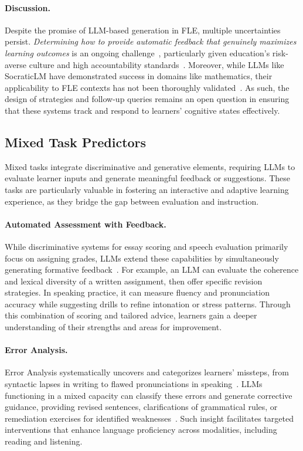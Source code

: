 \paragraph{Discussion.} Despite the promise of LLM-based generation in FLE, multiple uncertainties persist. \textit{Determining how to provide automatic feedback that genuinely maximizes learning outcomes} is an ongoing challenge~\cite{stamper2024enhancing}, particularly given education’s risk-averse culture and high accountability standards~\cite{xiao2024humanaicollaborativeessayscoring}. Moreover, while LLMs like SocraticLM have demonstrated success in domains like mathematics, their applicability to FLE contexts has not been thoroughly validated~\cite{liusocraticlm}. As such, the design of strategies and follow-up queries remains an open question in ensuring that these systems track and respond to learners' cognitive states effectively.


\subsection{Mixed Task Predictors}
Mixed tasks integrate discriminative and generative elements, requiring LLMs to evaluate learner inputs and generate meaningful feedback or suggestions. These tasks are particularly valuable in fostering an interactive and adaptive learning experience, as they bridge the gap between evaluation and instruction.

\paragraph{Automated Assessment with Feedback.} While discriminative systems for essay scoring and speech evaluation primarily focus on assigning grades, LLMs extend these capabilities by simultaneously generating formative feedback~\cite{katuka2024investigating,stahl2024exploring}. For example, an LLM can evaluate the coherence and lexical diversity of a written assignment, then offer specific revision strategies. In speaking practice, it can measure fluency and pronunciation accuracy while suggesting drills to refine intonation or stress patterns. Through this combination of scoring and tailored advice, learners gain a deeper understanding of their strengths and areas for improvement.

\paragraph{Error Analysis.} Error Analysis systematically uncovers and categorizes learners’ missteps, from syntactic lapses in writing to flawed pronunciations in speaking~\cite{james2013errors,erdougan2005contribution}. LLMs functioning in a mixed capacity can classify these errors and generate corrective guidance, providing revised sentences, clarifications of grammatical rules, or remediation exercises for identified weaknesses~\cite{myles2002second,mashoor2020error}. Such insight facilitates targeted interventions that enhance language proficiency across modalities, including reading and listening.

